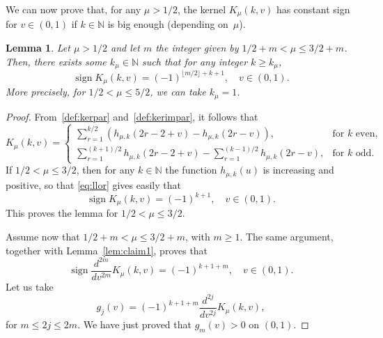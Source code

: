 \documentclass[10pt,a4paper]{article}
\numberwithin{equation}{section}
\theoremstyle{plain}
\newtheorem{Lem}[Theo]{Lemma}
\theoremstyle{definition}
\newcommand{\NN}{\mathbb{N}}
\newcommand{\sign}{\operatorname{sign}}
\begin{document}
We can now prove that, for any $\mu > 1/2$, the kernel $K_{\mu}(k,v)$ has constant sign for $v \in (0,1)$ if $k \in \NN$ is big enough (depending on~$\mu$).

\begin{Lem}
\label{lem:pp2}
Let $\mu > 1/2$ and let $m$ the integer given by $1/2 + m < \mu \leq 3/2 + m$.
Then, there exists some $k_\mu\in\NN$ such that for any integer $k\ge k_\mu$,
\[
   \sign K_{\mu}(k,v) = (-1)^{\lfloor m/2\rfloor+k+1},\quad v\in(0,1).
\]
More precisely, for $1/2 < \mu \leq 5/2$, we can take $k_\mu=1$.
\end{Lem}

\begin{proof}
From~\eqref{def:kerpar} and~\eqref{def:kerimpar}, it follows that
\begin{equation}
\label{eq:llor}
   K_\mu(k,v) = \begin{cases}
   \sum\limits_{r=1}^{k/2}(h_{\mu,k} (2r-2+v)-h_{\mu,k} (2r-v)),
   &\text{for } k \text{ even},
   \\[8pt]
   \sum\limits_{r=1}^{(k+1)/2}h_{\mu,k} (2r-2+v) - \sum\limits_{r=1}^{(k-1)/2}h_{\mu,k} (2r-v),
   &\text{for } k \text{ odd}.
\end{cases}
\end{equation}
If $1/2 < \mu\le 3/2$, then for any $k \in \NN$ the function $h_{\mu,k}(u)$ is increasing and positive, so that \eqref{eq:llor} gives easily that
\[
   \sign K_{\mu}(k,v) = (-1)^{k+1}, \quad v \in(0,1).
\]
This proves the lemma for $1/2 < \mu \leq 3/2$.

Assume now that $1/2 + m < \mu \leq 3/2 + m$, with $m \geq 1$. The same argument, together with Lemma~\ref{lem:claim1}, proves that
\[
   \sign \frac{d^{2m}}{dv^{2m}} K_\mu(k,v) = (-1)^{k+1+m},
   \quad v \in (0,1).
\]
Let us take
\[
   g_j(v) = (-1)^{k+1+m} \frac{d^{2j}}{dv^{2j}} K_\mu(k,v),
\]
for $m \leq 2j \leq 2m$. We have just proved that $g_m(v) > 0$ on $(0,1)$.


\end{proof}
\end{document}
